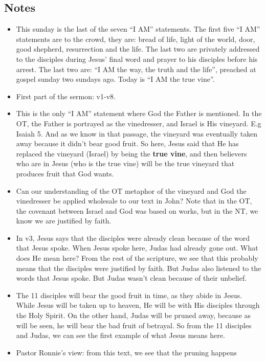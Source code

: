 \subsection*{Notes}
\begin{itemize}
  \item{This sunday is the last of the seven ``I AM'' statements. The first
  five ``I AM'' statements are to the crowd, they are: bread of life, light
  of the world, door, good shepherd, resurrection and the life. The last two
  are privately addressed to the disciples during Jesus' final word and
  prayer to his disciples before his arrest. The last two are: ``I AM the
  way, the truth and the life'', preached at gospel sunday two sundays ago.
  Today is ``I AM the true vine''.}
  \item{First part of the sermon: v1-v8.}
  \item{This is the only ``I AM'' statement where God the Father is
  mentioned. In the OT, the Father is portrayed as the vinedresser, and
  Israel is His vineyard. E.g Isaiah 5. And as we know in that passage, the
  vineyard was eventually taken away because it didn't bear good fruit. So
  here, Jesus said that He has replaced the vineyard (Israel) by being the
  \textbf{true vine}, and then believers who are in Jesus (who is the true
  vine) will be the true vineyard that produces fruit that God wants.}
  \item{Can our understanding of the OT metaphor of the vineyard and God the
  vinedresser be applied wholesale to our text in John? Note that in the OT,
  the covenant between Israel and God was based on works, but in the NT, we
  know we are justified by faith.}
  \item{In v3, Jesus says that the disciples were already clean because of
  the word that Jesus spoke. When Jesus spoke here, Judas had already gone
  out. What does He mean here? From the rest of the scripture, we see that
  this probably means that the disciples were justified by faith. But Judas
  also listened to the words that Jesus spoke. But Judas wasn't clean because
  of their unbelief.}
  \item{The 11 disciples will bear the good fruit in time, as they abide in
  Jesus. While Jesus will be taken up to heaven, He will be with His
  disciples through the Holy Spirit. On the other hand, Judas will be pruned
  away, because as will be seen, he will bear the bad fruit of betrayal. So from the 11 disciples and Judas, we can see the first example of
  what Jesus means here.}
  \item{Pastor Ronnie's view: from this text, we see that the pruning happens
}
\end{itemize}
